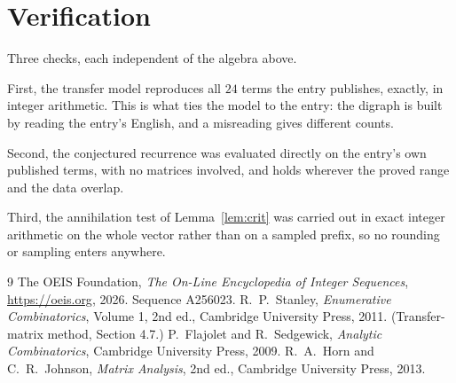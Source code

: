 \documentclass[11pt,a4paper]{article}
\theoremstyle{plain}
\theoremstyle{definition}
\begin{document}
\section{Verification}

Three checks, each independent of the algebra above.

First, the transfer model reproduces all $24$ terms the entry publishes, exactly, in
integer arithmetic. This is what ties the model to the entry: the digraph is built by reading
the entry's English, and a misreading gives different counts.

Second, the conjectured recurrence was evaluated directly on the entry's own published terms,
with no matrices involved, and holds wherever the proved range and the data overlap.

Third, the annihilation test of Lemma~\ref{lem:crit} was carried out in exact integer
arithmetic on the whole vector rather than on a sampled prefix, so no rounding or sampling
enters anywhere.

\begin{thebibliography}{9}
 The OEIS Foundation, \emph{The On-Line Encyclopedia of Integer
Sequences}, \url{https://oeis.org}, 2026. Sequence A256023.
 R.~P.~Stanley, \emph{Enumerative Combinatorics}, Volume 1, 2nd ed.,
Cambridge University Press, 2011. (Transfer-matrix method, Section 4.7.)
 P.~Flajolet and R.~Sedgewick, \emph{Analytic Combinatorics}, Cambridge
University Press, 2009.
 R.~A.~Horn and C.~R.~Johnson, \emph{Matrix Analysis}, 2nd ed., Cambridge
University Press, 2013.
\end{thebibliography}
\end{document}
